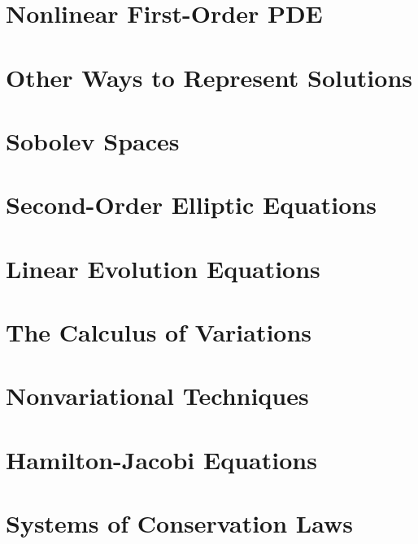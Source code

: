 \chapter{Nonlinear First-Order PDE}
\label{chap:nonlinear-first-order-pde}


\chapter{Other Ways to Represent Solutions}
\label{chap:other-ways-to-represent-solutions}


\chapter{Sobolev Spaces}
\label{chap:sobolev-spaces}


\chapter{Second-Order Elliptic Equations}
\label{chap:second-order-elliptic-equations}


\chapter{Linear Evolution Equations}
\label{chap:linear-evolution-equations}


\chapter{The Calculus of Variations}
\label{chap:the-calculus-of-variations}


\chapter{Nonvariational Techniques}
\label{chap:nonvariational-techniques}


\chapter{Hamilton-Jacobi Equations}
\label{chap:hamilton-jacobi-equations}


\chapter{Systems of Conservation Laws}
\label{chap:systems-of-conservation-laws}


